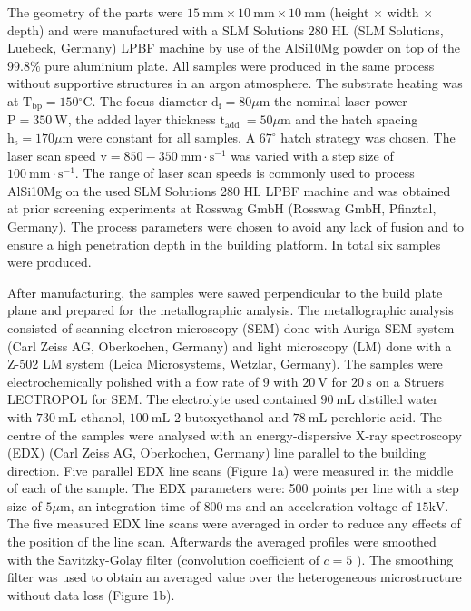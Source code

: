 \documentclass[10pt]{article}
\begin{document}
The geometry of the parts were $15 \mathrm{~mm} \times 10 \mathrm{~mm} \times 10 \mathrm{~mm}$ (height $\times$ width $\times$ depth) and were manufactured with a SLM Solutions 280 HL (SLM Solutions, Luebeck, Germany) LPBF machine by use of the AlSi10Mg powder on top of the $99.8 \%$ pure aluminium plate. All samples were produced in the same process without supportive structures in an argon atmosphere. The substrate heating was at $\mathrm{T}_{\mathrm{bp}}=150{ }^{\circ} \mathrm{C}$. The focus diameter $\mathrm{d}_{\mathrm{f}}=80 \mu \mathrm{m}$ the nominal laser power $\mathrm{P}=350 \mathrm{~W}$, the added layer thickness $\mathrm{t}_{\text {add }}=50 \mu \mathrm{m}$ and the hatch spacing $\mathrm{h}_{\mathrm{s}}=170 \mu \mathrm{m}$ were constant for all samples. A $67^{\circ}$ hatch strategy was chosen. The laser scan speed $\mathrm{v}=850-350 \mathrm{~mm} \cdot \mathrm{s}^{-1}$ was varied with a step size of $100 \mathrm{~mm} \cdot \mathrm{s}^{-1}$. The range of laser scan speeds is commonly used to process AlSi10Mg on the used SLM Solutions 280 HL LPBF machine and was obtained at prior screening experiments at Rosswag GmbH (Rosswag GmbH, Pfinztal, Germany). The process parameters were chosen to avoid any lack of fusion and to ensure a high penetration depth in the building platform. In total six samples were produced.

After manufacturing, the samples were sawed perpendicular to the build plate plane and prepared for the metallographic analysis. The metallographic analysis consisted of scanning electron microscopy (SEM) done with Auriga SEM system (Carl Zeiss AG, Oberkochen, Germany) and light microscopy (LM) done with a Z-502 LM system (Leica Microsystems, Wetzlar, Germany). The samples were electrochemically polished with a flow rate of 9 with $20 \mathrm{~V}$ for $20 \mathrm{~s}$ on a Struers LECTROPOL for SEM. The electrolyte used contained $90 \mathrm{~mL}$ distilled water with $730 \mathrm{~mL}$ ethanol, $100 \mathrm{~mL}$ 2-butoxyethanol and $78 \mathrm{~mL}$ perchloric acid. The centre of the samples were analysed with an energy-dispersive X-ray spectroscopy (EDX) (Carl Zeiss AG, Oberkochen, Germany) line parallel to the building direction. Five parallel EDX line scans (Figure 1a) were measured in the middle of each of the sample. The EDX parameters were: 500 points per line with a step size of $5 \mu \mathrm{m}$, an integration time of $800 \mathrm{~ms}$ and an acceleration voltage of $15 \mathrm{kV}$. The five measured EDX line scans were averaged in order to reduce any effects of the position of the line scan. Afterwards the averaged profiles were smoothed with the Savitzky-Golay filter (convolution coefficient of $c=5$ ). The smoothing filter was used to obtain an averaged value over the heterogeneous microstructure without data loss (Figure 1b).
\end{document}
